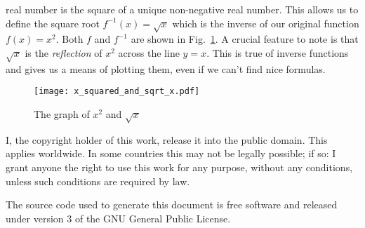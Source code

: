 \documentclass{article}
\begin{document}
    real number is the square of a unique non-negative real number. This allows
    us to define the square root $f^{-1}(x)=\sqrt{x}$ which is the inverse
    of our original function $f(x)=x^{2}$. Both $f$ and $f^{-1}$ are
    shown in Fig.~\ref{fig:x2_and_sqrt_x}. A crucial feature to note is that
    $\sqrt{x}$ is the \textit{reflection} of $x^{2}$ across the line $y=x$.
    This is true of inverse functions and gives us a means of plotting them,
    even if we can't find nice formulas.
    \begin{figure}
        \centering
        \texttt{[image: x\_squared\_and\_sqrt\_x.pdf]}
        \caption{The graph of $x^{2}$ and $\sqrt{x}$}
        \label{fig:x2_and_sqrt_x}
    \end{figure}
    \newpage
    I, the copyright holder of this work, release it into the public domain.
    This applies worldwide. In some countries this may not be legally possible;
    if so: I grant anyone the right to use this work for any purpose, without
    any conditions, unless such conditions are required by law.
    \par\hfill\par
    The source code used to generate this document is free software and released
    under version 3 of the GNU General Public License.
\end{document}
